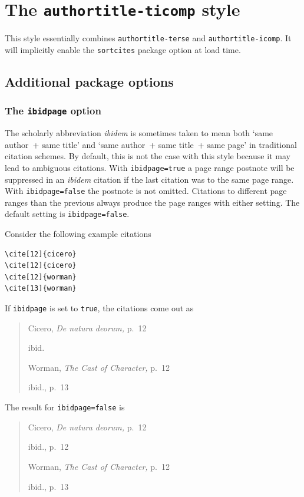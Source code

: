 \documentclass[a4paper]{article}
\begin{document}
\section*{The \texttt{authortitle-ticomp} style}

This style essentially combines \texttt{authortitle-terse} and
\texttt{authortitle-icomp}. It will implicitly enable the
\texttt{sortcites} package option at load time.

\subsection*{Additional package options}

\subsubsection*{The \texttt{ibidpage} option}

The scholarly abbreviation \emph{ibidem} is sometimes taken to mean
both `same author~+ same title' and `same author~+ same title~+ same
page' in traditional citation schemes. By default, this is not the
case with this style because it may lead to ambiguous citations.
With \texttt{ibidpage=true} a page range postnote will be suppressed
in an \emph{ibidem} citation if the last citation was to the same
page range. With \texttt{ibidpage=false} the postnote is not omitted.
Citations to different page ranges than the previous always produce
the page ranges with either setting.
The default setting is \texttt{ibidpage=false}.

Consider the following example citations
\begin{verbatim}
\cite[12]{cicero}
\cite[12]{cicero}
\cite[12]{worman}
\cite[13]{worman}
\end{verbatim}
%
If \texttt{ibidpage} is set to \texttt{true}, the citations
come out as
\begin{quote}
Cicero, \emph{De natura deorum,} p.~12

ibid.

Worman, \emph{The Cast of Character,} p.~12

ibid., p.~13
\end{quote}
%
The result for \texttt{ibidpage=false} is
\begin{quote}
Cicero, \emph{De natura deorum,} p.~12

ibid., p.~12

Worman, \emph{The Cast of Character,} p.~12

ibid., p.~13
\end{quote}
\end{document}
